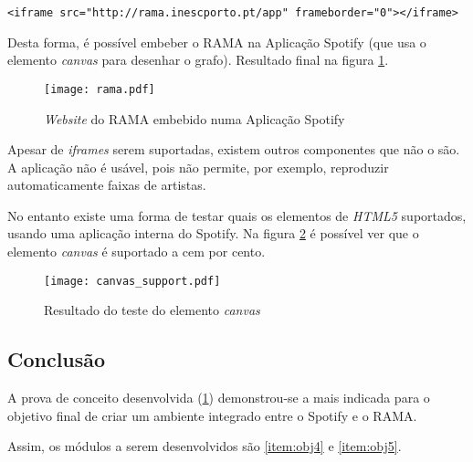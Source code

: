     \begin{lstlisting}[caption={Elemento \emph{iframe} que embebe o \emph{website} do RAMA na aplicação}]
      <iframe src="http://rama.inescporto.pt/app" frameborder="0"></iframe>\end{lstlisting}

    Desta forma, é possível embeber o RAMA na Aplicação Spotify (que usa o elemento \emph{canvas} para desenhar o grafo).
    Resultado final na figura \ref{fig:rama_spotifyed}.

    \begin{figure}
      \begin{center}
        \texttt{[image: rama.pdf]}
      \end{center}
      \caption{\emph{Website} do RAMA embebido numa Aplicação Spotify}
      \label{fig:rama_spotifyed}
    \end{figure}

    Apesar de \emph{iframes} serem suportadas, existem outros componentes que não o são.
    A aplicação não é usável, pois não permite, por exemplo, reproduzir automaticamente faixas de artistas.

    No entanto existe uma forma de testar quais os elementos de \emph{HTML5} suportados, usando uma aplicação interna do Spotify.
    Na figura \ref{fig:canvas_support} é possível ver que o elemento \emph{canvas} é suportado a cem por cento.

    \begin{figure}
       \begin{center}
         \texttt{[image: canvas\_support.pdf]}
       \end{center}
       \caption{Resultado do teste do elemento \emph{canvas}}
       \label{fig:canvas_support}
     \end{figure}


  \subsection{Conclusão} %
  \label{sub:conclusao}
  
    A prova de conceito desenvolvida (\ref{fig:rama_spotifyed}) demonstrou-se a mais indicada para o objetivo final de criar um ambiente integrado entre o Spotify e o RAMA.

    Assim, os módulos a serem desenvolvidos são \ref{item:obj4} e \ref{item:obj5}.

